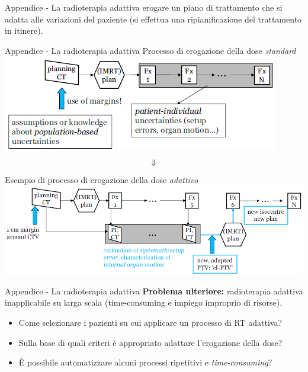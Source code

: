 \documentclass{beamer}
\begin{document}
\begin{frame}{Appendice - La radioterapia adattiva}
 erogare un piano di trattamento che si adatta alle variazioni del paziente (si effettua una ripianificazione del trattamento in itinere).
\end{frame}


\begin{frame}{Appendice - La radioterapia adattiva}
\centering
\alert{Processo di erogazione della dose \textit{standard}}\\ \vspace{.4cm}
\includegraphics[width=.7\textwidth]{../cap3/Adapt0.png}
$$\large \Downarrow$$
\alert{Esempio di processo di erogazione della dose \textit{adattivo}}\\ \vspace{.4cm}
\includegraphics[width=.8\textwidth]{../cap3/Adapt2.png}

\end{frame}



\begin{frame}{Appendice - La radioterapia adattiva}
\footnotesize
\alert{\bf Problema ulteriore:} radioterapia adattiva inapplicabile su larga scala (time-consuming e impiego improprio di risorse).
\begin{itemize}
\item Come selezionare i pazienti su cui applicare un processo di RT adattiva?
\item Sulla base di quali criteri è appropriato adattare l'erogazione della dose?
\item \`E possibile automatizzare alcuni processi ripetitivi e \textit{time-consuming}?
\end{itemize}
\vspace{.5cm}

\end{frame}
\end{document}
